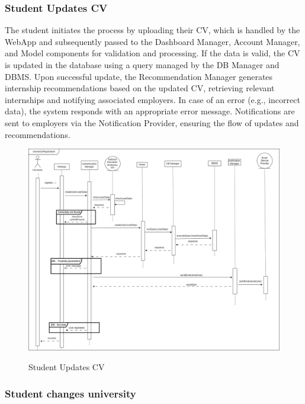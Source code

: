 \documentclass[a4paper,12pt]{article}
\begin{document}
\subsubsection*{Student Updates CV}
The student initiates the process by uploading their CV, which is handled by the WebApp and subsequently passed to the Dashboard Manager, Account Manager, and Model components for validation and processing. If the data is valid, the CV is updated in the database using a query managed by the DB Manager and DBMS. Upon successful update, the Recommendation Manager generates internship recommendations based on the updated CV, retrieving relevant internships and notifying associated employers. In case of an error (e.g., incorrect data), the system responds with an appropriate error message. Notifications are sent to employers via the Notification Provider, ensuring the flow of updates and recommendations.
\begin{figure}[H]
\centering
\includegraphics[scale = 0.35]{DD_figures/RuntimeView/UniversityRegistrationRV.drawio.png}\\
\caption{Student Updates CV}
\end{figure}

\subsubsection*{Student changes university}
\end{document}
